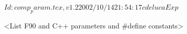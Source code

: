 $Id: comp_param.tex,v 1.2 2002/10/14 21:54:17 cdeluca Exp $
%


<List F90 and C++ parameters and \#define constants>
